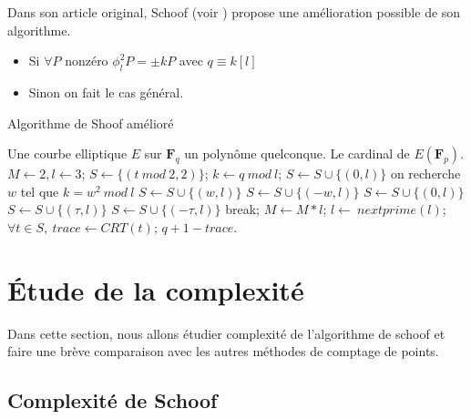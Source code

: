 \documentclass{article}%
\theoremstyle{plain}
\theoremstyle{definition}
\theoremstyle{plain}
\theoremstyle{plain}
\theoremstyle{remark}
\newcommand\fq{\mathbf{F}_{q}}
\begin{document}
Dans son article original, Schoof (voir \cite{ref1}) propose une amélioration possible de son algorithme.
\begin{itemize}
\item Si $\forall P$ nonzéro $\phi_{l}^{2}P = \pm kP$ avec $q\equiv k[l]$ 
\item Sinon on fait le cas général.
\end{itemize}

\begin{algorithm}
\caption{Algorithme de Shoof amélioré}
\label{schoof2}
\begin{algorithmic} 
\REQUIRE Une courbe elliptique $E$ sur $\fq$ un polynôme quelconque.
\ENSURE Le cardinal de $E(\mathbf{F}_{p})$.
\STATE $M\leftarrow 2, l\leftarrow 3$;
\STATE $S\leftarrow \{(t\ mod\ 2, 2)\}$; 
    \STATE $k\leftarrow q\ mod\ l$;	
            \STATE $S\leftarrow S\cup \{(0, l)\}$
            \ELSE
                \STATE on recherche $w$ tel que $k=w^{2}\ mod\ l$
                    \STATE $S\leftarrow S\cup \{(w, l)\}$ \OR $S\leftarrow S\cup \{(-w, l)\}$ 
                \ELSE
                    \STATE $S\leftarrow S\cup \{(0, l)\}$
                \ENDIF
            \ENDIF
    \ELSE
                \STATE $S\leftarrow S\cup \{(\tau, l)\}$ \OR $S\leftarrow S\cup \{(-\tau, l)\}$ 
                \STATE break;
            \ENDIF
        \ENDFOR
    \ENDIF
    \STATE $M\leftarrow M*l$;
    \STATE $l\leftarrow\ nextprime(l)$; 	
\ENDWHILE
\STATE $\forall t\in S,\ trace\leftarrow CRT(t)$; 
\RETURN $q + 1 - trace$.
\end{algorithmic}
\end{algorithm}

\section{Étude de la complexité}

Dans cette section, nous allons étudier complexité de l'algorithme de schoof et faire une brève comparaison avec les autres méthodes de comptage de points.

\subsection{Complexité de Schoof}
\end{document}
